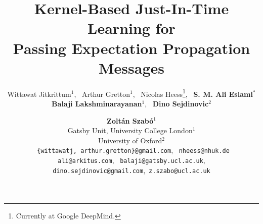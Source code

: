 \documentclass[english]{article}
\theoremstyle{plain}
\theoremstyle{plain}
\begin{document}
\title{Kernel-Based Just-In-Time Learning for \\Passing Expectation Propagation
Messages}

\author{
    Wittawat Jitkrittum$^1$, \, Arthur Gretton$^1$, \, Nicolas
    Heess\thanks{\hspace{1mm} Currently at Google DeepMind.}, \,
\textbf{S. M. Ali Eslami}$^*$ \\
\textbf{Balaji Lakshminarayanan}$^1$, \, \textbf{Dino Sejdinovic}$^2$ \and \textbf{ Zolt{\'a}n Szab{\'o}}$^1$  \vspace*{2mm} \\
Gatsby Unit, University College London$^1$ \\
\vspace*{2mm}
University of Oxford$^2$ \\
\texttt{ \{wittawatj,  arthur.gretton\}@gmail.com}, \, \texttt{nheess@nhuk.de} \\ 
\texttt{ali@arkitus.com}, \, \texttt{balaji@gatsby.ucl.ac.uk},\\
\texttt{dino.sejdinovic@gmail.com},\, \texttt{z.szabo@ucl.ac.uk}
}

\maketitle
\end{document}
